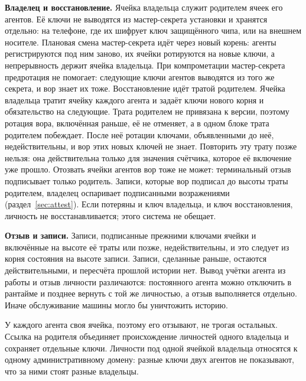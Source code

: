 \documentclass[10pt,a4paper]{article}
\begin{document}
\textbf{Владелец и восстановление.}
Ячейка владельца служит родителем ячеек его агентов.
Её ключи не выводятся из мастер-секрета установки и хранятся отдельно: на телефоне, где их шифрует ключ защищённого чипа, или на внешнем носителе.
Плановая смена мастер-секрета идёт через новый корень: агенты регистрируются под ним заново, их ячейки ротируются на новые ключи, а непрерывность держит ячейка владельца.
При компрометации мастер-секрета предротация не помогает: следующие ключи агентов выводятся из того же секрета, и вор знает их тоже.
Восстановление идёт тратой родителем.
Ячейка владельца тратит ячейку каждого агента и задаёт ключи нового корня и обязательство на следующие.
Трата родителем не привязана к версии, поэтому ротация вора, включённая раньше, её не отменяет, а в одном блоке трата родителем побеждает.
После неё ротации ключами, объявленными до неё, недействительны, и вор этих новых ключей не знает.
Повторить эту трату позже нельзя: она действительна только для значения счётчика, которое её включение уже прошло.
Отозвать ячейки агентов вор тоже не может: терминальный отзыв подписывает только родитель.
Записи, которые вор подписал до высоты траты родителем, владелец оспаривает подписанными возражениями (раздел~\ref{sec:attest}).
Если потеряны и ключ владельца, и ключ восстановления, личность не восстанавливается; этого система не обещает.

\textbf{Отзыв и записи.}
Записи, подписанные прежними ключами ячейки и включённые на высоте её траты или позже, недействительны, и это следует из корня состояния на высоте записи.
Записи, сделанные раньше, остаются действительными, и пересчёта прошлой истории нет.
Вывод учётки агента из работы и отзыв личности различаются: постоянного агента можно отключить в рантайме и позднее вернуть с той же личностью, а отзыв выполняется отдельно.
Иначе обслуживание машины могло бы уничтожить историю.

У каждого агента своя ячейка, поэтому его отзывают, не трогая остальных.
Ссылка на родителя объединяет происхождение личностей одного владельца и сохраняет отдельные ключи.
Личности под одной ячейкой владельца относятся к одному административному домену: разные ключи двух агентов не показывают, что за ними стоят разные владельцы.
\end{document}
